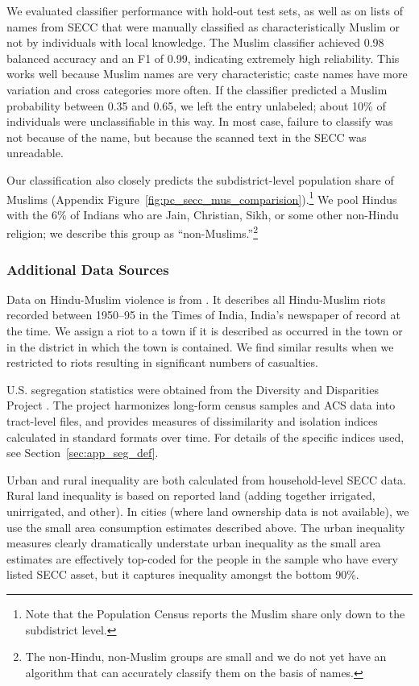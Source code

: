 \documentclass[12pt]{article}
\begin{document}
We evaluated classifier performance with hold-out test sets, as well as on lists of names from SECC that were manually classified as characteristically Muslim or not by individuals with local knowledge. The Muslim classifier achieved 0.98 balanced accuracy and an F1 of 0.99, indicating extremely high reliability. This works well because Muslim names are very characteristic; caste names have more variation and cross categories more often. If the classifier predicted a Muslim probability between 0.35 and 0.65, we left the entry unlabeled; about 10\% of individuals were unclassifiable in this way. In most case, failure to classify was not because of the name, but because the scanned text in the SECC was unreadable.

Our classification also closely predicts the subdistrict-level population share of Muslims (Appendix Figure~\ref{fig:pc_secc_mus_comparision}).\footnote{Note that the Population Census reports the Muslim share only down to the subdistrict level.} We pool Hindus with the 6\% of Indians who are Jain, Christian, Sikh, or some other non-Hindu religion; we describe this group as ``non-Muslims.''\footnote{The non-Hindu, non-Muslim groups are small and we do not yet have an algorithm that can accurately classify them on the basis of names.}

\subsubsection{Additional Data Sources}

Data on Hindu-Muslim violence is from \citet{varshney2006}. It describes all Hindu-Muslim riots recorded between 1950--95 in the Times of India, India's newspaper of record at the time. We assign a riot to a town if it is described as occurred in the town or in the district in which the town is contained. We find similar results when we restricted to riots resulting in significant numbers of casualties.

U.S. segregation statistics were obtained from the Diversity and Disparities Project \citet{logan2020}. The project harmonizes long-form census samples and ACS data into tract-level files, and provides measures of dissimilarity and isolation indices calculated in standard formats over time. For details of the specific indices used, see Section~\ref{sec:app_seg_def}.

Urban and rural inequality are both calculated from household-level SECC data. Rural land inequality is based on reported land (adding together irrigated, unirrigated, and other). In cities (where land ownership data is not available), we use the small area consumption estimates described above. The urban inequality measures clearly dramatically understate urban inequality as the small area estimates are effectively top-coded for the people in the sample who have every listed SECC asset, but it captures inequality amongst the bottom 90\%.
\end{document}

